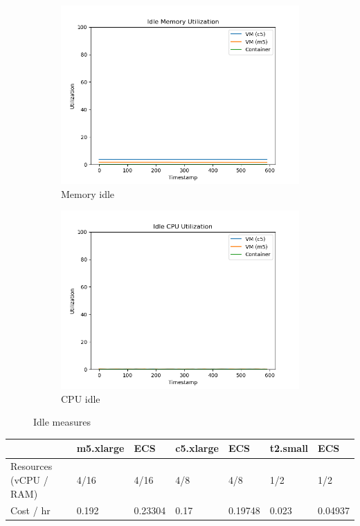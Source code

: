 \documentclass[11pt]{article}
\begin{document}
\begin{figure}[H]
\centering
\begin{subfigure}{.5\textwidth}
  \centering
  \includegraphics[width=1.1\linewidth]{idle_mem.png}
  \caption{Memory idle}
  \label{fig:idlemem}
\end{subfigure}%
\begin{subfigure}{.5\textwidth}
  \centering
  \includegraphics[width=1.1\linewidth]{idle_cpu.png}
  \caption{CPU idle}
  \label{fig:idlecpu}
\end{subfigure}
\caption{Idle measures}
\label{fig:rubis}
\end{figure}

\begin{table}[hbt!]
    \begin{tabular}{|l|l|l|l|l|l|l|}
    \hline
                           & m5.xlarge & ECS     & c5.xlarge  & ECS     & t2.small  & ECS     \\ \hline
    Resources (vCPU / RAM) & 4/16      & 4/16    & 4/8        & 4/8     & 1/2       & 1/2     \\ \hline
    Cost / hr              & 0.192     & 0.23304 & 0.17       & 0.19748 & 0.023     & 0.04937 \\ \hline
    \end{tabular}
\end{table}
\end{document}
